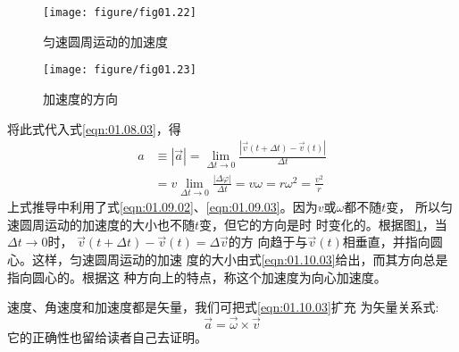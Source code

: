 \documentclass[../outline-of-mechanics.tex]{subfiles}
\begin{document}
\begin{figure}[!h]
  \small\centering
  \begin{minipage}[b]{14em}
    \texttt{[image: figure/fig01.22]}
    \vspace{1em}
    \caption{匀速圆周运动的加速度}
    \label{fig:01.22}
  \end{minipage}
  \begin{minipage}[b]{14em}
    \centering
    \texttt{[image: figure/fig01.23]}
    \caption{加速度的方向}
    \label{fig:01.23}
  \end{minipage}
\end{figure}
\noindent 将此式代入式\eqref{eqn:01.08.03}，得
\begin{equation}\label{eqn:01.10.03}
  \begin{aligned}
    a & \equiv|\vec{a}|=\lim _{\Delta t \rightarrow 0} \frac{|\vec{v}\left(t+\Delta t\right)-\vec{v}\left(t\right)|}{\Delta t} \\
      & =v\lim_{\Delta t \rightarrow 0} \frac{|\Delta \varphi|}{\Delta t}=v \omega=r \omega^{2}=\frac{v^{2}}{r}
  \end{aligned}
\end{equation}\vspace{0.5em}
上式推导中利用了式\eqref{eqn:01.09.02}、\eqref{eqn:01.09.03}。因为$v$或$\omega$都不随$t$变，
所以匀速圆周运动的加速度的大小也不随$t$变，但它的方向是时
时变化的。根据图\ref{fig:01.23}，当$\Delta t\rightarrow 0$时，
$\vec{v}\left(t+ \Delta t\right)-\vec{v}\left(t\right)=\Delta\vec{v}$的方
向趋于与$\vec{v}\left(t\right)$相垂直，并指向圆心。这样，匀速圆周运动的加速
度的大小由式\eqref{eqn:01.10.03}给出，而其方向总是指向圆心的。根据这
种方向上的特点，称这个加速度为向心加速度。

速度、角速度和加速度都是矢量，我们可把式\eqref{eqn:01.10.03}扩充
为矢量关系式:
\clearpage
~\vspace{-1.56em}
\begin{equation}\label{eqn:01.10.04}
  \vec{a}= \vec{\omega}\times \vec{v}
\end{equation}
它的正确性也留给读者自己去证明。
\end{document}
